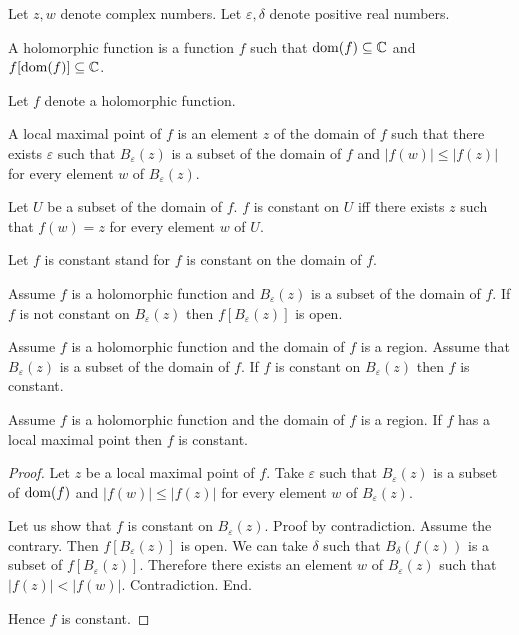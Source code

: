 \documentclass{article}
\newcommand{\Ball}[2]{B_{#1}(#2)}
\begin{document}
\begin{forthel}
Let $z, w$ denote complex numbers.
Let $\varepsilon, \delta$ denote positive real numbers.

\begin{signature}
  A holomorphic function is a function $f$ such that $\operatorname{dom}(f) \subseteq \mathbb{C}$
  and $f[\operatorname{dom}(f)] \subseteq \mathbb{C}$.
\end{signature}

Let $f$ denote a holomorphic function.

\begin{definition}
  A local maximal point of $f$ is an element $z$ of the domain of $f$ such that there exists
  $\varepsilon$ such that $\Ball{\varepsilon}{z}$ is a subset of the domain of $f$ and
  $|f(w)| \leq |f(z)|$ for every element $w$ of $\Ball{\varepsilon}{z}$.
\end{definition}

\begin{definition}
  Let $U$ be a subset of the domain of $f$. $f$ is constant on $U$ iff there exists
  $z$ such that $f(w) = z$ for every element $w$ of $U$.
\end{definition}

Let $f$ is constant stand for $f$ is constant on the domain of $f$.

\begin{axiom}
  Assume $f$ is a holomorphic function and $\Ball{\varepsilon}{z}$ is a subset of the domain of $f$.
  If $f$ is not constant on $\Ball{\varepsilon}{z}$
  then $f[\Ball{\varepsilon}{z}]$ is open.
\end{axiom}

\begin{axiom}
  Assume $f$ is a holomorphic function and the domain of $f$ is a region.
  Assume that $\Ball{\varepsilon}{z}$ is a subset of the domain of $f$.
  If $f$ is constant on $\Ball{\varepsilon}{z}$ then $f$ is constant.
\end{axiom}

\begin{proposition}
  Assume $f$ is a holomorphic function and the domain of $f$ is a region.
  If $f$ has a local maximal point then $f$ is constant.
\end{proposition}
\begin{proof}
  Let $z$ be a local maximal point of $f$.
  Take $\varepsilon$ such that
  $\Ball{\varepsilon}{z}$ is a subset of $\operatorname{dom}(f)$
  and $|f(w)| \leq |f(z)|$ for every element $w$ of $\Ball{\varepsilon}{z}$.

  Let us show that $f$ is constant on $\Ball{\varepsilon}{z}$.
  Proof by contradiction.
    Assume the contrary.
    Then $f[\Ball{\varepsilon}{z}]$ is open.
    We can take $\delta$ such that
    $\Ball{\delta}{f(z)}$ is a subset of $f[\Ball{\varepsilon}{z}]$.
    Therefore there exists an element $w$ of $\Ball{\varepsilon}{z}$ such that
    $|f(z)| < |f(w)|$.
    Contradiction.
  End.

  Hence $f$ is constant.
\end{proof}
\end{forthel}
\end{document}
